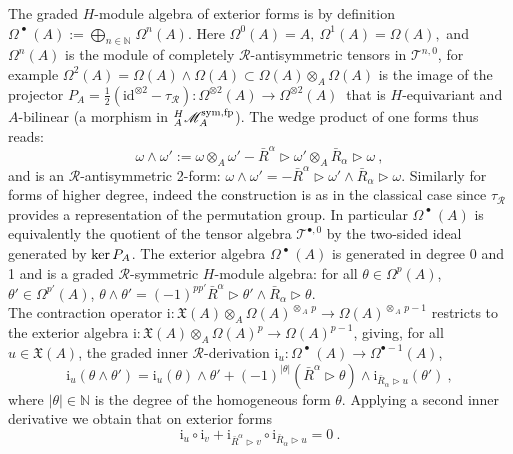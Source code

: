 \documentclass[12pt]{article}
\numberwithin{equation}{section}
\theoremstyle{plain}
\theoremstyle{definition}
\theoremstyle{remark}
\def\Vect{\mathfrak{X}}
\def\VV{\Vect(A)}
\def\id{\mathrm{id}}
\def\MMM{\mathscr{M}}
\def\ra{\triangleright}
\def\TT{{\mathcal T}}
\def\ker{{\rm ker}}
\def\AA{A}
\def\sym{{\rm{sym}}}
\def\ii{\mathrm{i}}
\def\oR{\bar R}
\def\al{\alpha}
\def\catfp{{{}^H_\AA\MMM_\AA^{\sym, \rm{fp}}}}
\def\OMmu{\Omega^{\bullet -1\!}}
\def\OM{{\Omega^{\!\!\;\bullet}\!\!\:(A)}}
\begin{document}
The graded
$H$-module algebra  of exterior forms is by definition $\OM:=\bigoplus_{n\in \mathbb{N\,}}\Omega^{
  n}(A)$. Here $\Omega^0(A)=A,~\Omega^1(A)=\Omega(A),$ and 
$\Omega^n(A)$ is the module of completely  ${\mathcal{R}}$-antisymmetric tensors in
$\TT^{n,0}$, for example
$
\Omega^2(A)=\Omega(A)\wedge \Omega(A)\subset \Omega
 (A)\otimes_\AA \Omega(A)$ is the image of the projector
$P_A=\frac{1}{2}(\id^{\otimes 2}-\tau_{{\mathcal{R}}}): \Omega^{\otimes 2}(A)\to
\Omega^{\otimes 2}(A)~
$
that is $H$-equivariant and $A$-bilinear  (a morphism in $\catfp$). 
The wedge product of one forms thus reads:
\begin{equation}\label{wedgeonforms}
\omega\wedge \omega':=\omega\otimes_\AA
\omega'-{\oR}^\al\ra \omega'\otimes_\AA {\oR}_\al\ra\omega~,
\end{equation}
and is an  ${\mathcal{R}}$-antisymmetric 2-form: $\omega\wedge \omega'=- \oR^\al\ra \omega'\wedge  {\oR}_\al\ra\omega$.
Similarly for forms of higher degree, indeed the construction is as in the classical
case since $\tau_{{\mathcal{R}}}$ provides a representation of the
permutation group. In particular  $\OM$ is equivalently the quotient
of the tensor algebra $\TT^{\bullet, 0}$ by the two-sided ideal
generated by $\ker \,P_A$.
The exterior algebra $\OM$ is generated in degree 0 and 1 and is a
graded  ${\mathcal{R}}$-symmetric $H$-module algebra: for all $\theta\in \Omega^p(A)$, $\theta'\in
\Omega^{p'}(A)$, $\theta\wedge\theta'= (-1)^{pp'}\oR^\al\ra\theta'\wedge
\oR_\al\ra\theta$. 
\\

The contraction operator $\ii:\VV\otimes_A\Omega(A)^{\otimes_{\!\!\:A\!\:} p}\to\Omega(A)^{\otimes_{\!\!\:A\!\:} p-1}$ restricts to the exterior algebra
$\ii:\VV\otimes_A\Omega(A)^{p}\to\Omega(A)^{p-1}$, giving, for all $u\in \Vect(A)$, the graded inner ${\mathcal{R}}$-derivation
$\ii_u:\OM\to\OMmu(A)$, 
\begin{equation}\label{braidedleibnizii}
  \ii_u(\theta\wedge\theta')=\ii_u(\theta)\wedge\theta'+(-1)^{|\theta|}(\oR^\al\ra
\theta)\wedge
\ii_{\oR_\al\ra u}(\theta')~,
\end{equation}
where $|\theta|\in \mathbb{N}$ is the degree of the homogeneous form
$\theta$.
Applying a second inner derivative
 we 
obtain that on exterior forms
\begin{equation}\label{ii}
\ii_u\circ \ii_v+\ii_{\oR^\al\ra v}\circ \ii_{\oR_\al \ra u}=0~.
\end{equation}
\end{document}
